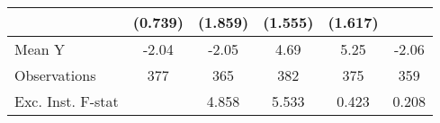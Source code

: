 {\begin{tabular}{l*{5}{c}}
            &     (0.739)         &     (1.859)         &     (1.555)         &     (1.617)         &                     \\
\midrule
Mean Y      &       -2.04         &       -2.05         &        4.69         &        5.25         &       -2.06         \\
Observations&         377         &         365         &         382         &         375         &         359         \\
Exc. Inst. F-stat&                     &       4.858         &       5.533         &       0.423         &       0.208         \\
\bottomrule
\end{tabular}
}
